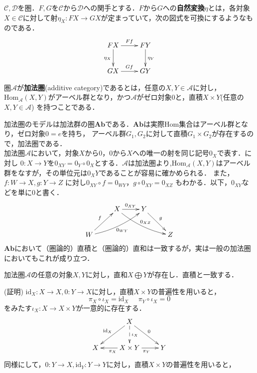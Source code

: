 
\begin{defi}
$\mathcal{C},\mathcal{D}$を圏．$F,G$を$\mathcal{C}$から$\mathcal{D}$への関手とする．$F$から$G$への{\bf 自然変換}$\eta$とは，各対象$X \in \mathcal{C}$に対して射$\eta_X : FX \to GX $が定まっていて，次の図式を可換にするようなものである．
\[ 
\xymatrix {
	FX	\ar[r]^{Ff} \ar[d]_{\eta_X}	& FY \ar[d]^{\eta_Y} \\
	GX	\ar[r]^{Gf} 				& GY
}
\]
\end{defi} \proofend

\begin{defi}
圏$\mathcal{A}$が{\bf 加法圏}(additive category)であるとは，任意の$X,Y \in \mathcal{A}$に対し，$\mathrm{Hom}_\mathcal{A}(X,Y)$がアーベル群となり，かつ$\mathcal{A}$がゼロ対象$0$と，直積$X \times Y$(任意の$X,Y \in \mathcal{A}$) を持つことである．
\end{defi} \proofend
加法圏のモデルは加法群の圏$\mathbf{Ab}$である．$\mathbf{Ab}$は実際Hom集合はアーベル群となり，ゼロ対象$0 = {e}$を持ち，
アーベル群$G_1,G_2$に対して直積$G_1 \times G_2 $が存在するので，加法圏である．\\
加法圏$\mathcal{A}$において，対象$X$から$0$，$0$から$X$への唯一の射を同じ記号$0_X$で表す．に対し
$0 : X \to Y$を$0_{XY} = 0_Y \circ 0_X$とする．$\mathcal{A}$は加法圏より,$\mathrm{Hom}_\mathcal{A}(X,Y)$はアーベル群をなすが，その単位元は$0_XY$であることが容易に確かめられる． また，$f:W \to X , g:Y\to Z$ に対し$0_{XY} \circ f = 0_{WY} ，
g \circ 0_{XY} = 0_{XZ}$ もわかる．以下，$0_{XY}$などを単に0と書く．
\[
\xymatrix{
&	X \ar[r]^{0_{XY}} \ar@/_/[rrd]^{0_{XZ}}& Y \ar[dr]^{g} \\
W  \ar[ur]^f \ar@/_/[urr]_{0_{WY}}&&&Z
}
\]
$\mathbf{Ab}$において（圏論的）直積と（圏論的）直和は一致するが，実は一般の加法圏においてもこれが成り立つ．
\begin{prop}
加法圏$\mathcal{A}$の任意の対象$X,Y$に対し，直和$X \bigoplus Y$が存在し．直積と一致する．
\end{prop}
(証明)
$\mathrm{id}_X : X \to X, 0 :Y \to X$に対し，直積$X \times Y$の普遍性を用いると，
\[
\pi_X \circ \iota_X = \mathrm{id}_X\;\;\;\;\;\pi_Y \circ \iota_X = 0
\]
をみたす$\iota_X : X \to X\times Y$が一意的に存在する．
\[
\xymatrix{
	& \ar[dl]_{\mathrm{id}_X} X  \ar@{-->}[d]^{\iota_X}  \ar[dr]^{0}	& \\
X 	& \ar[l]^{\pi_X} X \times Y \ar[r]_{\pi_Y} 	& Y 
}
\]
同様にして，$0: Y \to X, \mathrm{id}_Y:Y \to Y$に対し，直積$X \times Y$の普遍性を用いると，
